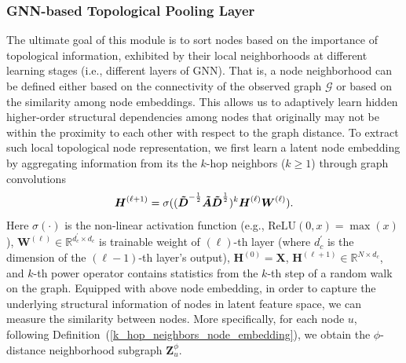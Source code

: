 \documentclass[letterpaper]{article} %
\begin{document}
\subsubsection{GNN-based Topological Pooling Layer}
The ultimate goal of this module is to sort nodes based on the importance of topological information, exhibited by their local neighborhoods at different learning stages (i.e., different layers of GNN). That is, a node neighborhood can be defined either based on the connectivity of the observed graph $\mathcal{G}$ or based on the similarity among node embeddings. This allows us to adaptively learn hidden higher-order structural dependencies among nodes that originally may not be within the proximity to each other with respect to the graph distance. %
To extract such local topological node representation, we first learn 
a latent node embedding by aggregating information from its the $k$-hop neighbors ($k \geq 1$) through graph convolutions
\begin{align}
\label{GNN_eq}
    {\boldsymbol{H}^{(\ell +1)}} = \sigma((\boldsymbol{\Tilde{D}}^{-\frac{1}{2}}\boldsymbol{\Tilde{A}}\boldsymbol{\Tilde{D}}^{\frac{1}{2}})^k\boldsymbol{H}^{(\ell)}\boldsymbol{W}^{(\ell)}).
\end{align}
Here $\sigma(\cdot)$ is the non-linear activation function (e.g., $\text{ReLU}(0, x) = \max{(x)}$), $\boldsymbol{W}^{(\ell)} \in \mathbb{R}^{d^\prime_c\times d_c}$ is trainable weight of $(\ell)$-th layer (where $d^\prime_c$ is the dimension of the $(\ell-1)$-th layer's output), $\boldsymbol{H}^{(0)} = \boldsymbol{X}$, $\boldsymbol{H}^{(\ell+1)} \in \mathbb{R}^{N \times d_c}$, and $k$-th power operator contains statistics from the $k$-th step of a random walk on the graph. %
Equipped with above node embedding, in order to capture the underlying structural information of nodes in latent feature space, we can measure the similarity between nodes. More specifically, for each node $u$, following Definition~(\ref{k_hop_neighbors_node_embedding}), we obtain the $\phi$-distance neighborhood subgraph $\boldsymbol{Z}^\phi_{u}$.
\end{document}
